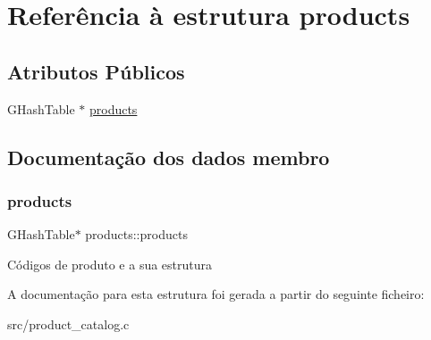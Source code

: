\hypertarget{structproducts}{}\section{Referência à estrutura products}
\label{structproducts}
\subsection*{Atributos Públicos}
\begin{DoxyCompactItemize}
\item 
G\+Hash\+Table $\ast$ \hyperlink{structproducts_a52238585d3b056994aa68fd56c15b869}{products}
\end{DoxyCompactItemize}


\subsection{Documentação dos dados membro}
\mbox{\label{structproducts_a52238585d3b056994aa68fd56c15b869}} 
\subsubsection{\texorpdfstring{products}{products}}
{\footnotesize\ttfamily G\+Hash\+Table$\ast$ products\+::products}

Códigos de produto e a sua estrutura 

A documentação para esta estrutura foi gerada a partir do seguinte ficheiro\+:\begin{DoxyCompactItemize}
\item 
src/product\+\_\+catalog.\+c\end{DoxyCompactItemize}
